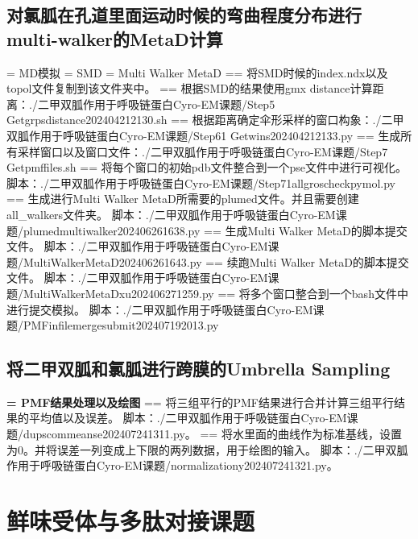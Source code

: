 \subsection{对氯胍在孔道里面运动时候的弯曲程度分布进行multi-walker的MetaD计算}
\noindent = MD模拟
\newline = SMD
\newline = Multi Walker MetaD
\newline == 将SMD时候的index.ndx以及topol文件复制到该文件夹中。
\newline == 根据SMD的结果使用gmx distance计算距离：./二甲双胍作用于呼吸链蛋白Cyro-EM课题/Step5 Getgrpsdistance202404212130.sh  
\newline == 根据距离确定伞形采样的窗口构象：./二甲双胍作用于呼吸链蛋白Cyro-EM课题/Step61 Getwins202404212133.py 
\newline == 生成所有采样窗口以及窗口文件：./二甲双胍作用于呼吸链蛋白Cyro-EM课题/Step7 Getpmffiles.sh 
\newline == 将每个窗口的初始pdb文件整合到一个pse文件中进行可视化。
脚本：./二甲双胍作用于呼吸链蛋白Cyro-EM课题/Step71allgroscheckpymol.py
\newline == 生成进行Multi Walker MetaD所需要的plumed文件。并且需要创建all\_walkers文件夹。
脚本：./二甲双胍作用于呼吸链蛋白Cyro-EM课题/plumedmultiwalker202406261638.py
\newline == 生成Multi Walker MetaD的脚本提交文件。
脚本：./二甲双胍作用于呼吸链蛋白Cyro-EM课题/MultiWalkerMetaD202406261643.py
\newline == 续跑Multi Walker MetaD的脚本提交文件。
脚本：./二甲双胍作用于呼吸链蛋白Cyro-EM课题/MultiWalkerMetaDxu202406271259.py
\newline == 将多个窗口整合到一个bash文件中进行提交模拟。
脚本：./二甲双胍作用于呼吸链蛋白Cyro-EM课题/PMFinfilemergesubmit202407192013.py
\subsection{将二甲双胍和氯胍进行跨膜的Umbrella Sampling}
\noindent \textbf{= PMF结果处理以及绘图}
\newline == 将三组平行的PMF结果进行合并计算三组平行结果的平均值以及误差。
脚本：./二甲双胍作用于呼吸链蛋白Cyro-EM课题/dupscommeanse202407241311.py。
\newline == 将水里面的曲线作为标准基线，设置为0。并将误差一列变成上下限的两列数据，用于绘图的输入。
脚本：./二甲双胍作用于呼吸链蛋白Cyro-EM课题/normalizationy202407241321.py。

\section{鲜味受体与多肽对接课题}
